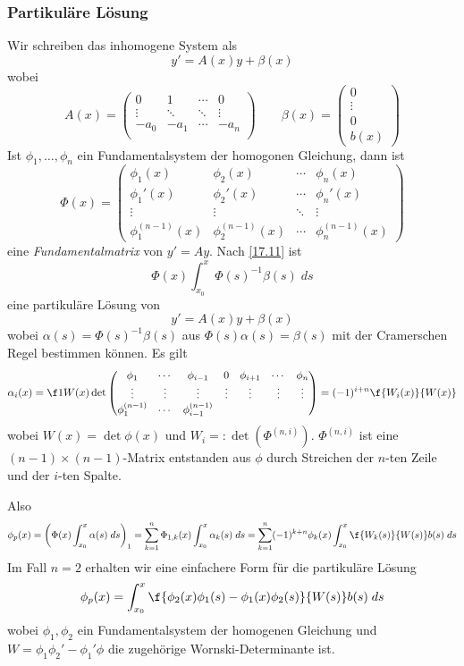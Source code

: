 \documentclass[a4paper,10pt]{scrartcl}
\begin{document}
\subsubsection{Partikuläre Lösung}

Wir schreiben das inhomogene System als
\[
	y' = A(x)y + \beta(x)
\]
wobei
\[
	A(x) = \begin{pmatrix}
		0 & 1 & \cdots & 0 \\
		\vdots & \ddots & \ddots & \vdots \\
		-a_0 & -a_1 & \cdots & -a_n\\
	\end{pmatrix} \qquad \beta(x) = \begin{pmatrix} 0\\\vdots \\ 0\\ b(x)\end{pmatrix}
\]
Ist $\phi_1,\dotsc, \phi_n$ ein Fundamentalsystem der homogonen Gleichung, dann ist
			\[
				\Phi(x) = \begin{pmatrix}\phi_1(x) & \phi_2(x) & \cdots & \phi_n(x)\\
				\phi_1'(x) & \phi_2'(x) & \cdots & \phi_n'(x)\\
				\vdots & \vdots & \ddots & \vdots\\
				\phi_1^{(n-1)}(x) & \phi_2^{(n-1)}(x) & \cdots & \phi_n^{(n-1)}(x)
				\end{pmatrix}
			\]
eine \emph{Fundamentalmatrix} von $y'=Ay$.
Nach \ref{17.11} ist
\[
	\Phi(x) \int_{x_0}^x \Phi(s)^{-1}\beta(s) \; ds
\]
eine partikuläre Lösung von
\[
	y' = A(x)y + \beta(x)
\]
wobei $\alpha(s) = \Phi(s)^{-1}\beta(s)$ aus $\Phi(s)\alpha(s) = \beta(s)$ mit der Cramerschen Regel bestimmen können.
Es gilt
\[
	\alpha_i(x) = \f 1{W(x)} \det \begin{pmatrix} 
		\phi_1 & \cdots & \phi_{i-1} & 0 & \phi_{i+1} & \cdots & \phi_n\\
		\vdots & \vdots & \vdots & \vdots & \vdots & \vdots & \vdots\\
		\phi_1^{(n-1)} & \cdots & \phi_{i-1}^{(n-1)}
	\end{pmatrix}
	= (-1)^{i+n}\f{W_i(x)}{W(x)}
\]
wobei $W(x) = \det \phi(x)$ und $W_i =: \det (\Phi^{(n,i)})$.
$\Phi^{(n,i)}$ ist eine $(n-1)\times(n-1)$-Matrix entstanden aus $\phi$ durch Streichen der $n$-ten Zeile und der $i$-ten Spalte.

Also
\[
	\phi_p(x) = \left(\Phi(x) \int_{x_0}^x \alpha(s) \; ds\right)_1 = \sum_{k=1}^n \Phi_{1,k}(x) \int_{x_0}^x \alpha_k(s) \; ds = \sum_{k=1}^n (-1)^{k+n}\phi_k(x) \int_{x_0}^x \f{W_k(s)}{W(s)}b(s) \; ds
\]
Im Fall $n=2$ erhalten wir eine einfachere Form für die partikuläre Lösung
\[
	\phi_p(x) = \int_{x_0}^x \f{\phi_2(x)\phi_1(s) - \phi_1(x) \phi_2(s)}{W(s)}b(s) \; ds
\]
wobei $\phi_1,\phi_2$ ein Fundamentalsystem der homogenen Gleichung und $W=\phi_1\phi_2' - \phi_1'\phi$ die zugehörige Wornski-Determinante ist.
\end{document}
